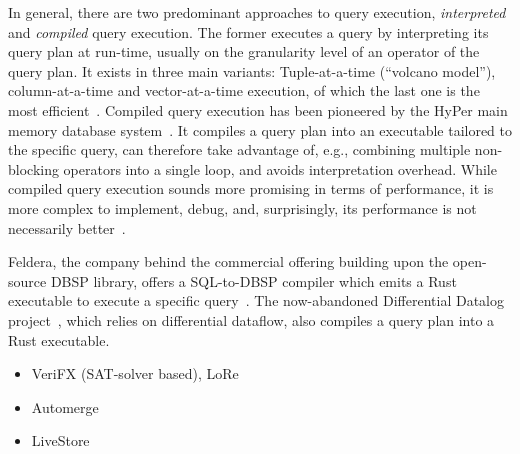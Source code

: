 In general, there are two predominant approaches to query execution,
\emph{interpreted} and \emph{compiled} query execution.
The former executes a query by interpreting its query plan at run-time,
usually on the granularity level of an operator of the query plan.
It exists in three main variants: Tuple-at-a-time (``volcano model''),
column-at-a-time and vector-at-a-time execution,
of which the last one is the most efficient~\cite{zukowski2005monetdb}.
Compiled query execution has been pioneered by the HyPer main memory database
system~\cite{neumann2011efficiently}.
It compiles a query plan into an executable tailored to the specific query,
can therefore take advantage of, e.g., combining multiple non-blocking operators
into a single loop, and avoids interpretation overhead.
While compiled query execution sounds more promising in terms of performance,
it is more complex to implement, debug, and, surprisingly, its performance
is not necessarily better~\cite{kersten2018everything}.

Feldera, the company behind the commercial offering building upon the
open-source DBSP library, offers a SQL-to-DBSP compiler which emits
a Rust executable to execute a specific query~\cite{feldera}.
The now-abandoned Differential Datalog project~\cite{ddlog}, which relies on
differential dataflow, also compiles a query plan into a Rust executable.

\begin{itemize}
	\item VeriFX (SAT-solver based), LoRe
	\item Automerge
	\item LiveStore
\end{itemize}
